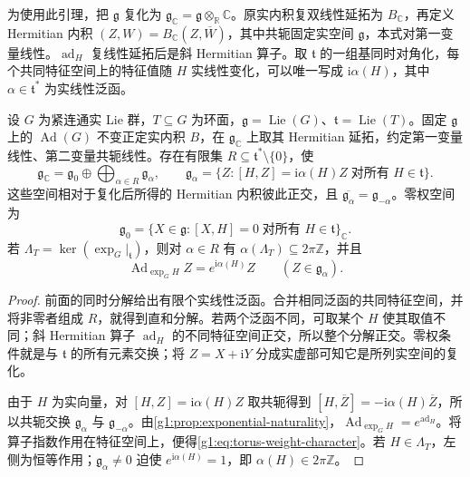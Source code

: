 为使用此引理，把 \(\mathfrak g\) 复化为 \(\mathfrak g_{\mathbb C}=\mathfrak g\otimes_{\mathbb R}\mathbb C\)。原实内积复双线性延拓为 \(B_{\mathbb C}\)，再定义 Hermitian 内积 \((Z,W)=B_{\mathbb C}(Z,\overline W)\)，其中共轭固定实空间 \(\mathfrak g\)，本式对第一变量线性。\(\operatorname{ad}_H\) 复线性延拓后是斜 Hermitian 算子。取 \(\mathfrak t\) 的一组基同时对角化，每个共同特征空间上的特征值随 \(H\) 实线性变化，可以唯一写成 \(\mathrm{i}\alpha(H)\)，其中 \(\alpha\in\mathfrak t^*\) 为实线性泛函。

\begin{proposition}\label{g1:prop:torus-weight-decomposition}
	设 \(G\) 为紧连通实 Lie 群，\(T\subseteq G\) 为环面，\(\mathfrak g=\operatorname{Lie}(G)\)、\(\mathfrak t=\operatorname{Lie}(T)\)。固定 \(\mathfrak g\) 上的 \(\operatorname{Ad}(G)\) 不变正定实内积 \(B\)，在 \(\mathfrak g_{\mathbb C}\) 上取其 Hermitian 延拓，约定第一变量线性、第二变量共轭线性。存在有限集 \(R\subseteq\mathfrak t^*\setminus\{0\}\)，使
	\begin{equation}\label{g1:eq:torus-adjoint-weight-decomposition}
		\mathfrak g_{\mathbb C}=\mathfrak g_0\oplus
		\bigoplus_{\alpha\in R}\mathfrak g_\alpha,
		\qquad
		\mathfrak g_\alpha=\{Z:[H,Z]=\mathrm{i}\alpha(H)Z
		\;\text{对所有 }H\in\mathfrak t\}.
	\end{equation}
	这些空间相对于复化后所得的 Hermitian 内积彼此正交，且 \(\overline{\mathfrak g_\alpha}=\mathfrak g_{-\alpha}\)。零权空间为
	\[
		\mathfrak g_0=\{X\in\mathfrak g:[X,H]=0
		\;\text{对所有 }H\in\mathfrak t\}_{\mathbb C}.
	\]
	若 \(\Lambda_T=\ker(\exp_G|_{\mathfrak t})\)，则对 \(\alpha\in R\) 有 \(\alpha(\Lambda_T)\subseteq2\pi\mathbb Z\)，并且
	\begin{equation}\label{g1:eq:torus-weight-character}
		\operatorname{Ad}_{\exp_GH}Z=e^{\mathrm{i}\alpha(H)}Z
		\qquad(Z\in\mathfrak g_\alpha).
	\end{equation}
\end{proposition}
\begin{proof}
	前面的同时分解给出有限个实线性泛函。合并相同泛函的共同特征空间，并将非零者组成 \(R\)，就得到直和分解。若两个泛函不同，可取某个 \(H\) 使其取值不同；斜 Hermitian 算子 \(\operatorname{ad}_H\) 的不同特征空间正交，所以整个分解正交。零权条件就是与 \(\mathfrak t\) 的所有元素交换；将 \(Z=X+\mathrm{i}Y\) 分成实虚部可知它是所列实空间的复化。

	由于 \(H\) 为实向量，对 \([H,Z]=\mathrm{i}\alpha(H)Z\) 取共轭得到 \([H,\overline Z]=-\mathrm{i}\alpha(H)\overline Z\)，所以共轭交换 \(\mathfrak g_\alpha\) 与 \(\mathfrak g_{-\alpha}\)。由\cref{g1:prop:exponential-naturality}，\(\operatorname{Ad}_{\exp_GH}=e^{\operatorname{ad}_H}\)。将算子指数作用在特征空间上，便得\eqref{g1:eq:torus-weight-character}。若 \(H\in\Lambda_T\)，左侧为恒等作用；\(\mathfrak g_\alpha\ne0\) 迫使 \(e^{\mathrm{i}\alpha(H)}=1\)，即 \(\alpha(H)\in2\pi\mathbb Z\)。
\end{proof}

